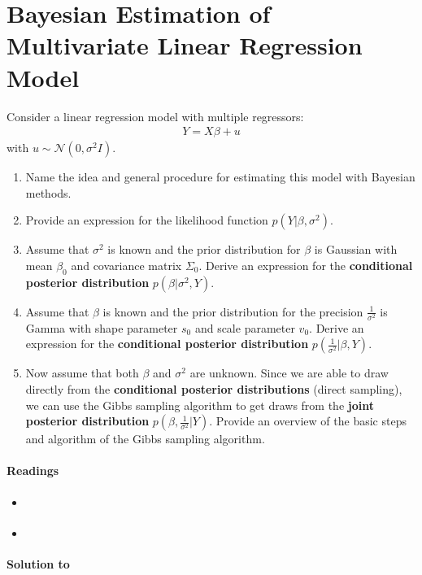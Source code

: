 \section[Bayesian Estimation of Multivariate Linear Regression Model]{Bayesian Estimation of Multivariate Linear Regression Model\label{ex:BayesianEstimationMultivariateLinearRegressionModel}}
Consider a linear regression model with multiple regressors:
\begin{align*}
Y = X\beta + u
\end{align*}
with \(u \sim \mathcal{N}(0, \sigma^2 I)\).

\begin{enumerate}

\item Name the idea and general procedure for estimating this model with Bayesian methods.

\item Provide an expression for the likelihood function \(p(Y|\beta,\sigma^2)\).

\item Assume that \(\sigma^2\) is known and the prior distribution for \(\beta \)
  is Gaussian with mean \(\beta_0\) and covariance matrix \(\Sigma_{0}\).
Derive an expression for the \textbf{conditional posterior distribution} \(p(\beta|\sigma^2,Y)\).

\item Assume that \(\beta \) is known and the prior distribution for the precision \(\frac{1}{\sigma^2}\) is Gamma
  with shape parameter \(s_0\) and scale parameter \(v_0\).
Derive an expression for the \textbf{conditional posterior distribution} \(p(\frac{1}{\sigma^2}|\beta,Y)\).

\item Now assume that both \(\beta \) and \(\sigma^2\) are unknown.
Since we are able to draw directly from the \textbf{conditional posterior distributions} (direct sampling),
  we can use the Gibbs sampling algorithm to get draws from the \textbf{joint posterior distribution} \(p(\beta,\frac{1}{\sigma^2}|Y)\).
Provide an overview of the basic steps and algorithm of the Gibbs sampling algorithm.
\end{enumerate}

\paragraph{Readings}
\begin{itemize}
\item \textcite[Ch. 7.1]{Greenberg_2008_IntroductionBayesianEconometrics}
\item \textcite[Ch. 3]{Koop_2003_BayesianEconometrics} 
\end{itemize}

\begin{solution}\textbf{Solution to }
\ifDisplaySolutions%

\fi
\newpage
\end{solution}